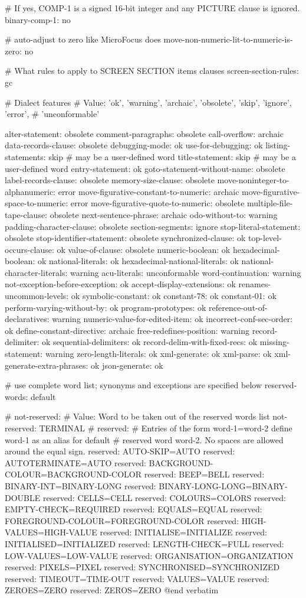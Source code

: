 # If yes, COMP-1 is a signed 16-bit integer and any PICTURE clause is ignored.
binary-comp-1:			no

# auto-adjust to zero like MicroFocus does
move-non-numeric-lit-to-numeric-is-zero: no

# What rules to apply to SCREEN SECTION items clauses
screen-section-rules:		gc

# Dialect features
# Value: 'ok', 'warning', 'archaic', 'obsolete', 'skip', 'ignore', 'error',
#        'unconformable'

alter-statement:			obsolete
comment-paragraphs:			obsolete
call-overflow:				archaic
data-records-clause:			obsolete
debugging-mode:				ok
use-for-debugging:			ok
listing-statements:			skip	# may be a user-defined word
title-statement:			skip	# may be a user-defined word
entry-statement:			ok
goto-statement-without-name:		obsolete
label-records-clause:			obsolete
memory-size-clause:			obsolete
move-noninteger-to-alphanumeric:	error
move-figurative-constant-to-numeric:	archaic
move-figurative-space-to-numeric:	error
move-figurative-quote-to-numeric:	obsolete
multiple-file-tape-clause:		obsolete
next-sentence-phrase:			archaic
odo-without-to:				warning
padding-character-clause:		obsolete
section-segments:			ignore
stop-literal-statement:			obsolete
stop-identifier-statement:		obsolete
synchronized-clause:			ok
top-level-occurs-clause:		ok
value-of-clause:			obsolete
numeric-boolean:			ok
hexadecimal-boolean:			ok
national-literals:			ok
hexadecimal-national-literals:		ok
national-character-literals:		warning
acu-literals:				unconformable
word-continuation:			warning
not-exception-before-exception:		ok
accept-display-extensions:		ok
renames-uncommon-levels:		ok
symbolic-constant:			ok
constant-78:				ok
constant-01:				ok
perform-varying-without-by:		ok
program-prototypes:			ok
reference-out-of-declaratives:		warning
numeric-value-for-edited-item:		ok
incorrect-conf-sec-order:		ok
define-constant-directive:		archaic
free-redefines-position:		warning
record-delimiter:			ok
sequential-delimiters:			ok
record-delim-with-fixed-recs:		ok
missing-statement:			warning
zero-length-literals:			ok
xml-generate:				ok
xml-parse:				ok
xml-generate-extra-phrases:		ok
json-generate:				ok

# use complete word list; synonyms and exceptions are specified below
reserved-words:		default

# not-reserved:
# Value: Word to be taken out of the reserved words list
not-reserved:	TERMINAL
# reserved:
#   Entries of the form word-1=word-2 define word-1 as an alias for default
# reserved word word-2. No spaces are allowed around the equal sign.
reserved:	AUTO-SKIP=AUTO
reserved:	AUTOTERMINATE=AUTO
reserved:	BACKGROUND-COLOUR=BACKGROUND-COLOR
reserved:	BEEP=BELL
reserved:	BINARY-INT=BINARY-LONG
reserved:	BINARY-LONG-LONG=BINARY-DOUBLE
reserved:	CELLS=CELL
reserved:	COLOURS=COLORS
reserved:	EMPTY-CHECK=REQUIRED
reserved:	EQUALS=EQUAL
reserved:	FOREGROUND-COLOUR=FOREGROUND-COLOR
reserved:	HIGH-VALUES=HIGH-VALUE
reserved:	INITIALISE=INITIALIZE
reserved:	INITIALISED=INITIALIZED
reserved:	LENGTH-CHECK=FULL
reserved:	LOW-VALUES=LOW-VALUE
reserved:	ORGANISATION=ORGANIZATION
reserved:	PIXELS=PIXEL
reserved:	SYNCHRONISED=SYNCHRONIZED
reserved:	TIMEOUT=TIME-OUT
reserved:	VALUES=VALUE
reserved:	ZEROES=ZERO
reserved:	ZEROS=ZERO
@end verbatim
